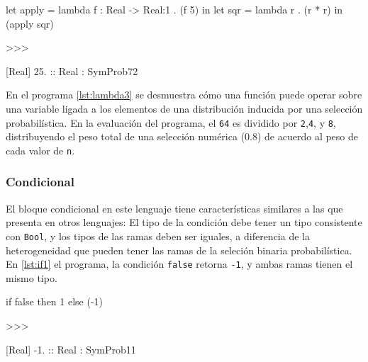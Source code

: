 \begin{gplcblock}[caption={Función como argumento de otra función},label={lst:lambda2}]
let apply = lambda f : Real -> {Real:1} . (f 5) in
let sqr = lambda r . (r * r) in
(apply sqr)

>>>

{
	 [Real] 25. :: Real : SymProb72 
}  

\end{gplcblock}





En el programa \ref{lst:lambda3} se desmuestra cómo una función
puede operar sobre una variable ligada a los elementos
de una distribución inducida por una selección probabilística.
En la evaluación del programa, el \lstinline|64| es dividido por \lstinline|2|,\lstinline|4|, y \lstinline|8|,
distribuyendo  el peso total de una selección numérica (0.8) de
acuerdo al peso de cada valor de \lstinline|n|.




\subsubsection{Condicional}

El bloque condicional en este lenguaje tiene
características similares a las que presenta
en otros lenguajes: El tipo de la condición
debe tener un tipo consistente con \lstinline|Bool|, y
los tipos de las ramas deben ser iguales, a
diferencia de la heterogeneidad que pueden tener
las ramas de la seleción binaria probabilística.
En \ref{lst:if1} el programa, la condición \lstinline|false| retorna \lstinline|-1|,
y ambas ramas tienen el mismo tipo.


\begin{gplcblock}[caption={if1},label={lst:if1}]
if false then 1 else (-1)

>>>

{
	 [Real] -1. :: Real : SymProb11 
}  
\end{gplcblock}

